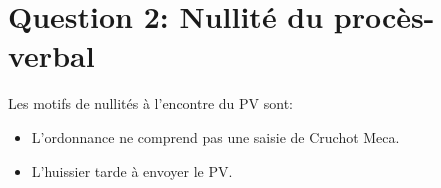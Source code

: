 \section{Question 2: Nullité du procès-verbal}

Les motifs de nullités à l'encontre du PV sont:
\begin{itemize}
    \item L'ordonnance ne comprend pas une saisie
    de Cruchot Meca.
    \item L'huissier tarde à envoyer le PV.
\end{itemize}